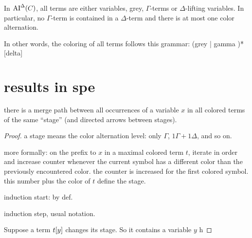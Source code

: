 \documentclass[,%
	paper=a4,%
	DIV10, %
	twoside=false,%
	liststotoc,
	bibtotoc,
	draft=false,%
	numbers=noendperiod
]{scrartcl}
\begin{document}
\begin{prop}
	\label{prop:no_delta_term_in_ai_delta}
	In $\operatorname{AI}^\Delta(C)$, all terms are either variables, grey, $\Gamma$-terms or $\Delta$-lifting variables. 
	In particular, no $\Gamma$-term is contained in a $\Delta$-term and there is at most one color alternation. 

	In other words, the coloring of all terms follows this grammar:
	(grey | gamma )* [delta]

\end{prop}
\section{results in spe}

\begin{clemma}
	there is a merge path between all occurrences of a variable $x$ in all colored terms of the same ``stage'' (and directed arrows between stages).
\end{clemma}
\begin{proof}
	a stage means the color alternation level: only $\Gamma$, $1 \Gamma + 1 \Delta$, and so on.

	more formally: on the prefix to $x$ in a maximal colored term $t$, iterate in order and increase counter whenever the current symbol has a different color than the previously encountered color. the counter is increased for the first colored symbol. this number plus the color of $t$ define the stage.

	induction start: by def.

	induction step, usual notation.

	Suppose a term $t[y]$ changes its stage. 
	So it contains a variable $y$ h





\end{proof}
\end{document}
